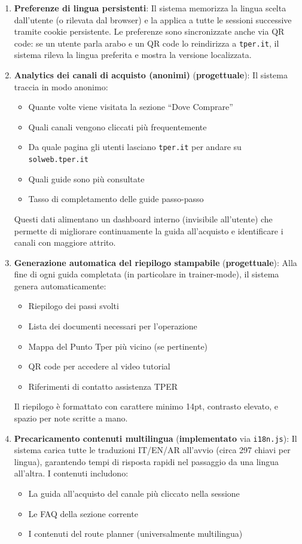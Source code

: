 \begin{tcolorbox}[colback=backgroundColor,colframe=borderColor,arc=2mm]
{\begin{enumerate}[leftmargin=*]
 \item \textbf{Preferenze di lingua persistenti}: Il sistema memorizza la lingua scelta dall'utente (o rilevata dal browser) e la applica a tutte le sessioni successive tramite cookie persistente. Le preferenze sono sincronizzate anche via QR code: se un utente parla arabo e un QR code lo reindirizza a \texttt{tper.it}, il sistema rileva la lingua preferita e mostra la versione localizzata.

 \item \textbf{Analytics dei canali di acquisto (anonimi)} (\textbf{progettuale}): Il sistema traccia in modo anonimo:
 \begin{itemize}
   \item Quante volte viene visitata la sezione ``Dove Comprare''
   \item Quali canali vengono cliccati più frequentemente
   \item Da quale pagina gli utenti lasciano \texttt{tper.it} per andare su \texttt{solweb.tper.it}
   \item Quali guide sono più consultate
   \item Tasso di completamento delle guide passo-passo
 \end{itemize}
 Questi dati alimentano un dashboard interno (invisibile all'utente) che permette di migliorare continuamente la guida all'acquisto e identificare i canali con maggiore attrito.

 \item \textbf{Generazione automatica del riepilogo stampabile} (\textbf{progettuale}): Alla fine di ogni guida completata (in particolare in trainer-mode), il sistema genera automaticamente:
 \begin{itemize}
   \item Riepilogo dei passi svolti
   \item Lista dei documenti necessari per l'operazione
   \item Mappa del Punto Tper più vicino (se pertinente)
   \item QR code per accedere al video tutorial
   \item Riferimenti di contatto assistenza TPER
 \end{itemize}
 Il riepilogo è formattato con carattere minimo 14pt, contrasto elevato, e spazio per note scritte a mano.

 \item \textbf{Precaricamento contenuti multilingua} (\textbf{implementato} via \texttt{i18n.js}): Il sistema carica tutte le traduzioni IT/EN/AR all'avvio (circa 297 chiavi per lingua), garantendo tempi di risposta rapidi nel passaggio da una lingua all'altra. I contenuti includono:
 \begin{itemize}
   \item La guida all'acquisto del canale più cliccato nella sessione
   \item Le FAQ della sezione corrente
   \item I contenuti del route planner (universalmente multilingua)
 \end{itemize}


\end{enumerate}}
\end{tcolorbox}
